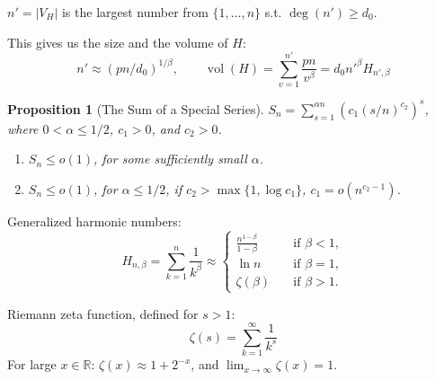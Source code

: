 \documentclass{beamer}
\newtheorem{proposition}{Proposition}
\DeclareMathOperator*{\vol}{vol}
\newcommand{\autotitle}{\secname\ifdefempty{\subsecname}{}{~--- \subsecname}}
\newcommand{\smalldisplayskips}{
    \setlength{\abovedisplayskip}{3pt}
    \setlength{\belowdisplayskip}{3pt}}
\begin{document}
\begin{frame}{\autotitle}
    \smalldisplayskips
    $n'=|V_H|$ is the largest number from $\{1,\ldots,n\}$ s.t. $\deg(n')\geq d_0$.
    
    This gives us the size and the volume of $H$:
    \begin{equation*}
        n'\approx(pn/d_0)^{1/\beta},
        \qquad\vol(H)=\sum_{v=1}^{n'}{\frac{pn}{v^\beta}}=d_0n'^\beta H_{n',\beta}
    \end{equation*}
    
    \begin{proposition}[The Sum of a Special Series]
        $S_n=\sum_{s=1}^{\alpha n}{\left(c_1(s/n)^{c_2}\right)^s}$,
        where $0<\alpha\leq 1/2$, $c_1>0$, and $c_2>0$.
        \begin{enumerate}
            \item $S_n\leq o(1)$, for some sufficiently small $\alpha$.
            \item $S_n\leq o(1)$, for $\alpha\leq 1/2$, if $c_2>\max\{1,\log c_1\}$,
            $c_1=o\left(n^{c_2-1}\right)$.
        \end{enumerate}
    \end{proposition}
\end{frame}

\begin{frame}{\autotitle}
    Generalized harmonic numbers:
    \begin{equation*}
        H_{n,\beta}=\sum_{k=1}^{n}\frac{1}{k^\beta}\approx
        \begin{cases}
            \frac{n^{1-\beta}}{1-\beta} & \quad \text{if } \beta<1,\\
            \ln n & \quad \text{if } \beta=1,\\
            \zeta(\beta) & \quad \text{if } \beta>1.
        \end{cases}
    \end{equation*}
    
    Riemann zeta function, defined for $s>1$:
    \begin{equation*}
        \zeta(s)=\sum_{k=1}^{\infty}\frac{1}{k^s}
    \end{equation*}
    For large $x\in\mathbb{R}$: $\zeta(x)\approx 1+2^{-x}$,
    and $\lim_{x\to\infty}\zeta(x)=1$.
\end{frame}
\end{document}
